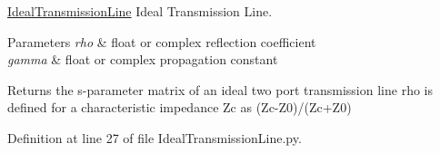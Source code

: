 \hyperlink{namespaceSignalIntegrity_1_1Devices_1_1IdealTransmissionLine}{Ideal\+Transmission\+Line} Ideal Transmission Line. 


\begin{DoxyParams}{Parameters}
{\em rho} & float or complex reflection coefficient \\
\hline
{\em gamma} & float or complex propagation constant \\
\hline
\end{DoxyParams}
\begin{DoxyReturn}{Returns}
the s-\/parameter matrix of an ideal two port transmission line rho is defined for a characteristic impedance Zc as (Zc-\/\+Z0)/(Zc+\+Z0) 
\end{DoxyReturn}


Definition at line 27 of file Ideal\+Transmission\+Line.\+py.

